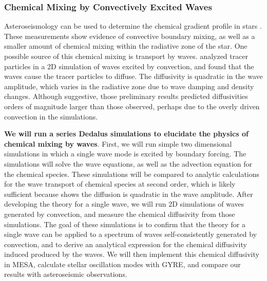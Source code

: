 \subsubsection{Chemical Mixing by Convectively Excited Waves}

Asteroseismology can be used to determine the chemical gradient profile in stars \citep{moravveji:15,moravveji:16,Ghasemi_2016}. These measurements show evidence of convective boundary mixing, as well as a smaller amount of chemical mixing within the radiative zone of the star. One possible source of this chemical mixing is transport by waves. \citet{Rogers2017} analyzed tracer particles in a 2D simulation of waves excited by convection, and found that the waves cause the tracer particles to diffuse. The diffusivity is quadratic in the wave amplitude, which varies in the radiative zone due to wave damping and density changes. Although suggestive, those preliminary results predicted diffusivities orders of magnitude larger than those observed, perhaps due to the overly driven convection in the simulations. 

\textbf{We will run a series Dedalus simulations to elucidate the physics of chemical mixing by waves}. First, we will run simple two dimensional simulations in which a single wave mode is excited by boundary forcing. The simulations will solve the wave equations, as well as the advection equation for the chemical species. These simulations will be compared to analytic calculations for the wave transport of chemical species at second order, which is likely sufficient because \citet{Rogers2017} shows the diffusion is quadratic in the wave amplitude. After developing the theory for a single wave, we will run 2D simulations of waves generated by convection, and measure the chemical diffusivity from those simulations. The goal of these simulations is to confirm that the theory for a single wave can be applied to a spectrum of waves self-consistently generated by convection, and to derive an analytical expression for the chemical diffusivity induced produced by the waves. We will then implement this chemical diffusivity in MESA, calculate stellar oscillation modes with GYRE, and compare our results with asteroseismic observations.